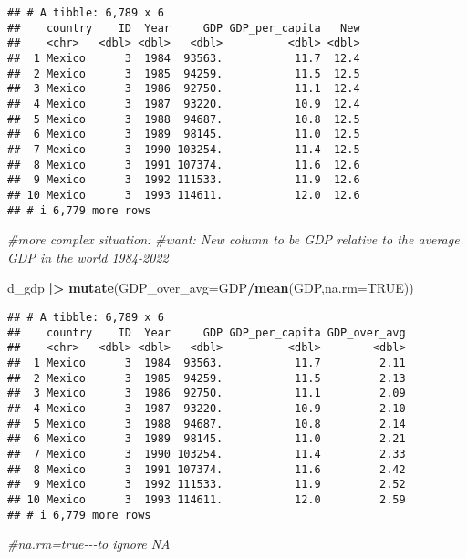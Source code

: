 \documentclass[
]{article}
\newenvironment{Shaded}{\begin{snugshade}}{\end{snugshade}}
\newcommand{\AttributeTok}[1]{\textcolor[rgb]{0.13,0.29,0.53}{#1}}
\newcommand{\CommentTok}[1]{\textcolor[rgb]{0.56,0.35,0.01}{\textit{#1}}}
\newcommand{\ConstantTok}[1]{\textcolor[rgb]{0.56,0.35,0.01}{#1}}
\newcommand{\FunctionTok}[1]{\textcolor[rgb]{0.13,0.29,0.53}{\textbf{#1}}}
\newcommand{\NormalTok}[1]{#1}
\newcommand{\SpecialCharTok}[1]{\textcolor[rgb]{0.81,0.36,0.00}{\textbf{#1}}}
\begin{document}
\begin{verbatim}
## # A tibble: 6,789 x 6
##    country    ID  Year     GDP GDP_per_capita   New
##    <chr>   <dbl> <dbl>   <dbl>          <dbl> <dbl>
##  1 Mexico      3  1984  93563.           11.7  12.4
##  2 Mexico      3  1985  94259.           11.5  12.5
##  3 Mexico      3  1986  92750.           11.1  12.4
##  4 Mexico      3  1987  93220.           10.9  12.4
##  5 Mexico      3  1988  94687.           10.8  12.5
##  6 Mexico      3  1989  98145.           11.0  12.5
##  7 Mexico      3  1990 103254.           11.4  12.5
##  8 Mexico      3  1991 107374.           11.6  12.6
##  9 Mexico      3  1992 111533.           11.9  12.6
## 10 Mexico      3  1993 114611.           12.0  12.6
## # i 6,779 more rows
\end{verbatim}

\begin{Shaded}
\begin{Highlighting}[]
\CommentTok{\#more complex situation:}
\CommentTok{\#want: New column to be GDP relative to the average GDP in the world 1984{-}2022}

\NormalTok{d\_gdp }\SpecialCharTok{|\textgreater{}} \FunctionTok{mutate}\NormalTok{(}\AttributeTok{GDP\_over\_avg=}\NormalTok{GDP}\SpecialCharTok{/}\FunctionTok{mean}\NormalTok{(GDP,}\AttributeTok{na.rm=}\ConstantTok{TRUE}\NormalTok{))}
\end{Highlighting}
\end{Shaded}

\begin{verbatim}
## # A tibble: 6,789 x 6
##    country    ID  Year     GDP GDP_per_capita GDP_over_avg
##    <chr>   <dbl> <dbl>   <dbl>          <dbl>        <dbl>
##  1 Mexico      3  1984  93563.           11.7         2.11
##  2 Mexico      3  1985  94259.           11.5         2.13
##  3 Mexico      3  1986  92750.           11.1         2.09
##  4 Mexico      3  1987  93220.           10.9         2.10
##  5 Mexico      3  1988  94687.           10.8         2.14
##  6 Mexico      3  1989  98145.           11.0         2.21
##  7 Mexico      3  1990 103254.           11.4         2.33
##  8 Mexico      3  1991 107374.           11.6         2.42
##  9 Mexico      3  1992 111533.           11.9         2.52
## 10 Mexico      3  1993 114611.           12.0         2.59
## # i 6,779 more rows
\end{verbatim}

\begin{Shaded}
\begin{Highlighting}[]
\CommentTok{\#na.rm=true{-}{-}{-}to ignore NA}
\end{Highlighting}
\end{Shaded}
\end{document}

